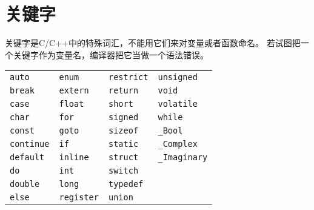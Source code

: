 \section{关键字}
\begin{frame}[fragile]\ft{}
关键字是C/C++中的特殊词汇，不能用它们来对变量或者函数命名。
若试图把一个关键字作为变量名，编译器把它当做一个语法错误。
\end{frame}

\begin{frame}[fragile]
\begin{table}
\centering
\begin{tabular}{p{2cm}|p{2cm}|p{2cm}|p{2cm}}\hline
\lstinline|auto|     & \lstinline|enum|     & \lstinline|restrict| & \lstinline|unsigned| \\
\lstinline|break|    & \lstinline|extern|   & \lstinline|return|   & \lstinline|void| \\
\lstinline|case|     & \lstinline|float|    & \lstinline|short|    & \lstinline|volatile| \\
\lstinline|char|     & \lstinline|for|      & \lstinline|signed|   & \lstinline|while| \\
\lstinline|const|    & \lstinline|goto|     & \lstinline|sizeof|   & \lstinline|_Bool| \\
\lstinline|continue| & \lstinline|if|       & \lstinline|static|   & \lstinline|_Complex| \\
\lstinline|default|  & \lstinline|inline|   & \lstinline|struct|   & \lstinline|_Imaginary|\\
\lstinline|do|       & \lstinline|int|      & \lstinline|switch|   &  \\
\lstinline|double|   & \lstinline|long|     & \lstinline|typedef|  &   \\
\lstinline|else|     & \lstinline|register| & \lstinline|union|    &   \\ \hline
\end{tabular}
\end{table}
\end{frame}


